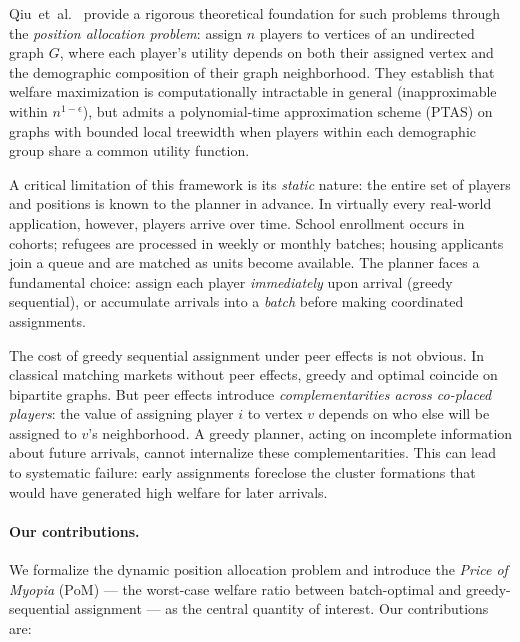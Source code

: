 \documentclass[11pt]{article}
\newcommand{\PoM}{\mathrm{PoM}}
\begin{document}
Qiu~et~al.~\cite{qiu2025welfare} provide a rigorous theoretical foundation for such
problems through the \emph{position allocation problem}: assign $n$ players to vertices
of an undirected graph $G$, where each player's utility depends on both their assigned
vertex and the demographic composition of their graph neighborhood.
They establish that welfare maximization is computationally intractable in general
(inapproximable within $n^{1-\epsilon}$), but admits a polynomial-time approximation
scheme (PTAS) on graphs with bounded local treewidth when players within each
demographic group share a common utility function.

A critical limitation of this framework is its \emph{static} nature: the entire set of
players and positions is known to the planner in advance.
In virtually every real-world application, however, players arrive over time.
School enrollment occurs in cohorts; refugees are processed in weekly or monthly
batches; housing applicants join a queue and are matched as units become available.
The planner faces a fundamental choice: assign each player \emph{immediately} upon
arrival (greedy sequential), or accumulate arrivals into a \emph{batch} before making
coordinated assignments.

The cost of greedy sequential assignment under peer effects is not obvious.
In classical matching markets without peer effects, greedy and optimal coincide on
bipartite graphs.
But peer effects introduce \emph{complementarities across co-placed players}: the value
of assigning player $i$ to vertex $v$ depends on who else will be assigned to
$v$'s neighborhood.
A greedy planner, acting on incomplete information about future arrivals, cannot
internalize these complementarities.
This can lead to systematic failure: early assignments foreclose the cluster formations
that would have generated high welfare for later arrivals.

\paragraph{Our contributions.}
We formalize the dynamic position allocation problem and introduce the
\emph{Price of Myopia} ($\PoM$) --- the worst-case welfare ratio between batch-optimal
and greedy-sequential assignment --- as the central quantity of interest.
Our contributions are:
\end{document}
